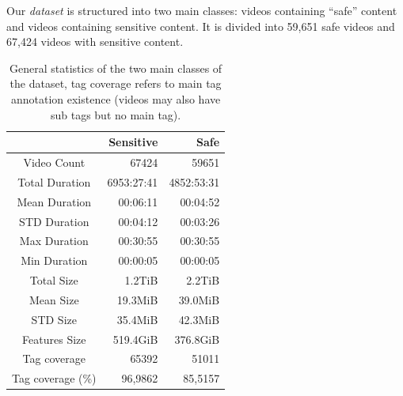


Our \textit{dataset} is structured into two main classes: videos containing ``safe'' content and videos containing sensitive content.
It is divided into 59,651 safe videos and 67,424 videos with sensitive content.

\begin{table}
\centering
\label{tab:general-stats}
\caption{General statistics of the two main classes of the dataset, tag coverage refers to main tag annotation existence (videos may also have sub tags but no main tag).}
\begin{tabular}{c|r|r} 
\multicolumn{1}{l|}{} & Sensitive  & Safe        \\ 
\hline
Video Count           & 67424      & 59651       \\ 
\hline
Total Duration        & 6953:27:41 & 4852:53:31  \\ 
\hline
Mean Duration         & 00:06:11   & 00:04:52    \\ 
\hline
STD Duration          & 00:04:12   & 00:03:26    \\ 
\hline
Max Duration          & 00:30:55   & 00:30:55    \\ 
\hline
Min Duration          & 00:00:05   & 00:00:05    \\ 
\hline
Total Size            & 1.2TiB     & 2.2TiB      \\ 
\hline
Mean Size             & 19.3MiB    & 39.0MiB     \\ 
\hline
STD Size              & 35.4MiB    & 42.3MiB     \\ 
\hline
Features Size         & 519.4GiB   & 376.8GiB    \\ 
\hline
Tag coverage          & 65392      & 51011       \\ 
\hline
Tag coverage (\%)     & 96,9862    & 85,5157     \\
\end{tabular}
\end{table}

